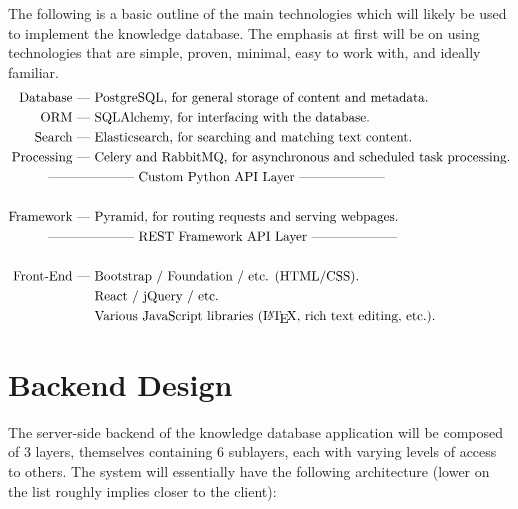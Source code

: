 \documentclass[12pt,letterpaper]{article}
\begin{document}
The following is a basic outline of the main technologies which will likely be used to implement the knowledge database. The emphasis at first will be on using technologies that are simple, proven, minimal, easy to work with, and ideally familiar.
\begin{align*}
\textrm{Database --- }& \textrm{PostgreSQL, for general storage of content and metadata.} \\
\textrm{ORM --- }& \textrm{SQLAlchemy, for interfacing with the database.} \\
\textrm{Search --- }& \textrm{Elasticsearch, for searching and matching text content.} \\ 
\textrm{Processing --- }& \textrm{Celery and RabbitMQ, for asynchronous and scheduled task processing.} \\ 
\textrm{-----------}& \textrm{--------- Custom Python API Layer --------------------} \\ \\
\textrm{Framework --- }& \textrm{Pyramid, for routing requests and serving webpages.} \\
\textrm{-----------}& \textrm{--------- REST Framework API Layer --------------------} \\ \\
\textrm{Front-End --- }& \textrm{Bootstrap / Foundation / etc. (HTML/CSS).} \\
& \textrm{React / jQuery / etc.} \\
& \textrm{Various JavaScript libraries (\LaTeX, rich text editing, etc.).}
\end{align*}




\section{Backend Design}

The server-side backend of the knowledge database application will be composed of 3 layers, themselves containing 6 sublayers, each with varying levels of access to others. The system will essentially have the following architecture (lower on the list roughly implies closer to the client):
\end{document}
